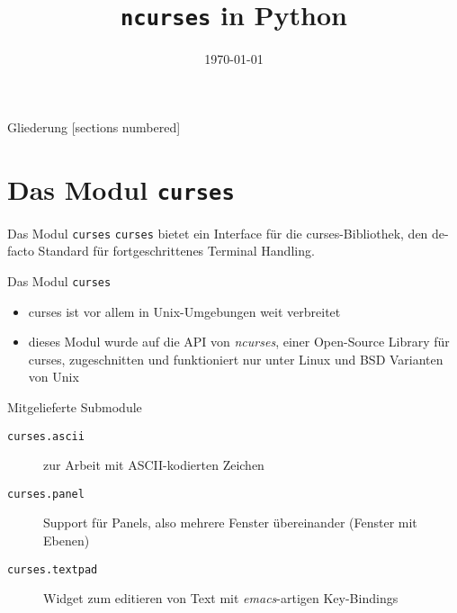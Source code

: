 



\title{\texttt{ncurses} in Python}
\date{\today}




\maketitle

\begin{frame}{Gliederung}
	[sections numbered]
	\tableofcontents
\end{frame}



\section{Das Modul \texttt{curses}}

\begin{frame}{Das Modul \texttt{curses}}
	\texttt{\alert{curses}} bietet ein Interface für die \glqq{}curses\grqq{}-Bibliothek, den de-facto Standard für fortgeschrittenes Terminal Handling.
\end{frame}

\begin{frame}{Das Modul \texttt{curses}}
	\begin{itemize}
		\item curses ist vor allem in Unix-Umgebungen weit verbreitet
		\item dieses Modul wurde auf die API von \emph{ncurses}, einer Open-Source Library  für curses, zugeschnitten und funktioniert nur unter Linux und BSD Varianten von Unix
	\end{itemize}
\end{frame}

\begin{frame}{Mitgelieferte Submodule}
	\begin{description}
		\item [\texttt{curses.ascii}] zur Arbeit mit ASCII-kodierten Zeichen
		\item [\texttt{curses.panel}] Support für Panels, also mehrere Fenster übereinander (Fenster mit Ebenen)
		\item [\texttt{curses.textpad}] Widget zum editieren von Text mit \emph{emacs}-artigen Key-Bindings
	\end{description}	
\end{frame}


